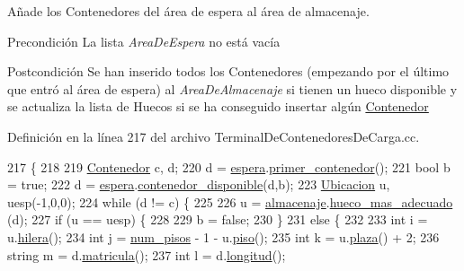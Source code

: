 Añade los Contenedores del área de espera al área de almacenaje. 

\begin{DoxyPrecond}{Precondición}
La lista {\itshape Area\+De\+Espera} no está vacía 
\end{DoxyPrecond}
\begin{DoxyPostcond}{Postcondición}
Se han inserido todos los Contenedores (empezando por el último que entró al área de espera) al {\itshape Area\+De\+Almacenaje} si tienen un hueco disponible y se actualiza la lista de Huecos si se ha conseguido insertar algún \hyperlink{class_contenedor}{Contenedor} 
\end{DoxyPostcond}


Definición en la línea 217 del archivo Terminal\+De\+Contenedores\+De\+Carga.\+cc.


\begin{DoxyCode}
217                                      \{
218     
219     \hyperlink{class_contenedor}{Contenedor} c, d;
220     d = \hyperlink{class_terminal_ac9f71207d73c8d05a9d9d6c046f9f8c3}{espera}.\hyperlink{class_espera_acf8ff210426ca3e799cf667d887e9daa}{primer\_contenedor}();
221     \textcolor{keywordtype}{bool} b = \textcolor{keyword}{true};
222     d = \hyperlink{class_terminal_ac9f71207d73c8d05a9d9d6c046f9f8c3}{espera}.\hyperlink{class_espera_ab4205de26cc518d8130d6506796697ea}{contenedor\_disponible}(d,b);
223     \hyperlink{class_ubicacion}{Ubicacion} u, uesp(-1,0,0);
224     \textcolor{keywordflow}{while} (d != c) \{
225         
226         u = \hyperlink{class_terminal_a1d87d7b16c4f460eee6f1ab73da90fd2}{almacenaje}.\hyperlink{class_almacenaje_a8a62209a8e83a59eb900913c3dc5f377}{hueco\_mas\_adecuado} (d);
227         \textcolor{keywordflow}{if} (u == uesp) \{
228             
229             b = \textcolor{keyword}{false};
230         \}
231         \textcolor{keywordflow}{else} \{
232             
233             \textcolor{keywordtype}{int} i = u.\hyperlink{class_ubicacion_abf00d08075e75ac833de7357ebc6f521}{hilera}();
234             \textcolor{keywordtype}{int} j = \hyperlink{class_terminal_ad6cdee7fe26b4443d45b0a18c345a86d}{num\_pisos} - 1 - u.\hyperlink{class_ubicacion_af6099f8de4dee993e4c9119e1f879070}{piso}();
235             \textcolor{keywordtype}{int} k = u.\hyperlink{class_ubicacion_abed323ffb2eace375e80bc395fdaeb39}{plaza}() + 2;
236             \textcolor{keywordtype}{string} m = d.\hyperlink{class_contenedor_aac5839c94f8d3be8a908740a1af0b716}{matricula}();
237             \textcolor{keywordtype}{int} l = d.\hyperlink{class_contenedor_a203894805dd0b8347f9884990dab0d9d}{longitud}();

\end{DoxyCode}
